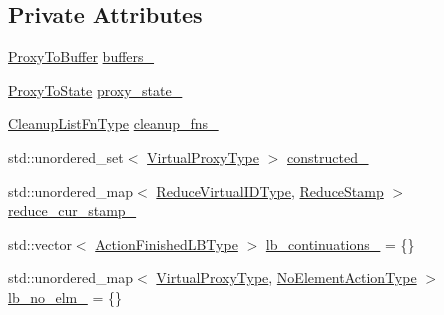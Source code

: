 \subsection*{Private Attributes}
\begin{DoxyCompactItemize}
\item 
\hyperlink{structvt_1_1vrt_1_1collection_1_1_collection_manager_a8229b3026c5790ed0783bd34c404e359}{Proxy\+To\+Buffer} \hyperlink{structvt_1_1vrt_1_1collection_1_1_collection_manager_aca3063c9343d57284746de0d9f1d9613}{buffers\+\_\+}
\item 
\hyperlink{structvt_1_1vrt_1_1collection_1_1_collection_manager_a47acf9cd5a988ba197fbef5097f75dde}{Proxy\+To\+State} \hyperlink{structvt_1_1vrt_1_1collection_1_1_collection_manager_a5bafa0103098ee13e3b3653431e2657d}{proxy\+\_\+state\+\_\+}
\item 
\hyperlink{structvt_1_1vrt_1_1collection_1_1_collection_manager_a735e54bc5a8646536d07750e2549a156}{Cleanup\+List\+Fn\+Type} \hyperlink{structvt_1_1vrt_1_1collection_1_1_collection_manager_a5123370561fb8eb70ef7c4979e051706}{cleanup\+\_\+fns\+\_\+}
\item 
std\+::unordered\+\_\+set$<$ \hyperlink{namespacevt_a1b417dd5d684f045bb58a0ede70045ac}{Virtual\+Proxy\+Type} $>$ \hyperlink{structvt_1_1vrt_1_1collection_1_1_collection_manager_a0718b47f3415e6d189f8a76068429d5c}{constructed\+\_\+}
\item 
std\+::unordered\+\_\+map$<$ \hyperlink{structvt_1_1vrt_1_1collection_1_1_collection_manager_ae820c8c22ae8c7350fa0232e0749b097}{Reduce\+Virtual\+I\+D\+Type}, \hyperlink{structvt_1_1vrt_1_1collection_1_1_collection_manager_ae8aac19e0ae07e9225142e5880eac830}{Reduce\+Stamp} $>$ \hyperlink{structvt_1_1vrt_1_1collection_1_1_collection_manager_a5bf3bcab36addad323a03746928dfac8}{reduce\+\_\+cur\+\_\+stamp\+\_\+}
\item 
std\+::vector$<$ \hyperlink{structvt_1_1vrt_1_1collection_1_1_collection_manager_a2649daab7b437e1e2bdb5f2eefff29b6}{Action\+Finished\+L\+B\+Type} $>$ \hyperlink{structvt_1_1vrt_1_1collection_1_1_collection_manager_aad857dc811570360f561b1ffc3df1b6c}{lb\+\_\+continuations\+\_\+} = \{\}
\item 
std\+::unordered\+\_\+map$<$ \hyperlink{namespacevt_a1b417dd5d684f045bb58a0ede70045ac}{Virtual\+Proxy\+Type}, \hyperlink{structvt_1_1vrt_1_1collection_1_1_collection_manager_a6b9b76aadc721cec45d3e0e02d849ff1}{No\+Element\+Action\+Type} $>$ \hyperlink{structvt_1_1vrt_1_1collection_1_1_collection_manager_af9d6e82381c808b5463e81643967ea59}{lb\+\_\+no\+\_\+elm\+\_\+} = \{\}

\end{DoxyCompactItemize}
